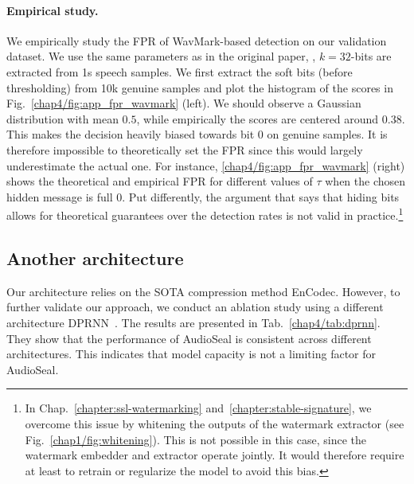 \paragraph{Empirical study.}
We empirically study the FPR of WavMark-based detection on our validation dataset.
We use the same parameters as in the original paper, \ie, $k=32$-bits are extracted from 1s speech samples.
We first extract the soft bits (before thresholding) from 10k genuine samples and plot the histogram of the scores in Fig.~\ref{chap4/fig:app_fpr_wavmark} (left).
We should observe a Gaussian distribution with mean $0.5$, while empirically the scores are centered around $0.38$. 
This makes the decision heavily biased towards bit 0 on genuine samples.
It is therefore impossible to theoretically set the FPR since this would largely underestimate the actual one.
For instance, \autoref{chap4/fig:app_fpr_wavmark} (right) shows the theoretical and empirical FPR for different values of $\tau$ when the chosen hidden message is full 0.
Put differently, the argument that says that hiding bits allows for theoretical guarantees over the detection rates is not valid in practice.\footnote{
    In Chap.~\ref{chapter:ssl-watermarking} and~\ref{chapter:stable-signature}, we overcome this issue by whitening the outputs of the watermark extractor (see Fig.~\ref{chap1/fig:whitening}).
    This is not possible in this case, since the watermark embedder and extractor operate jointly. 
    It would therefore require at least to retrain or regularize the model to avoid this bias.
}








\subsection{Another architecture}
\label{chap4/app:other-arch}

Our architecture relies on the SOTA compression method EnCodec. 
However, to further validate our approach, we conduct an ablation study using a different architecture DPRNN~\citep{luo2020dual}. 
The results are presented in Tab.~\ref{chap4/tab:dprnn}.
They show that the performance of AudioSeal is consistent across different architectures. 
This indicates that model capacity is not a limiting factor for AudioSeal.

